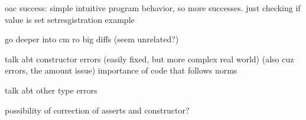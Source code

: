 oac success:
simple intuitive program behavior, so more successes. just checking if value is set
setresgistration example

go deeper into cm ro big diffs (seem unrelated?)

talk abt constructor errors (easily fixed, but more complex real world)
(also cuz errors, the amount issue)
importance of code that follows norms

talk abt other type errors

possibility of correction of asserts and constructor?